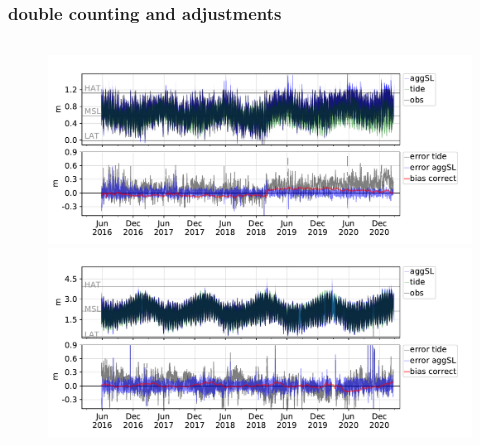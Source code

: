 \begin{frame}
\frametitle{double counting and adjustments}
\begin{columns}
    \begin{column}{0.5\textwidth}
      \begin{figure}      
        \includegraphics[width=\textwidth]{figures/plots/008314_verify_ts.pdf}
        \includegraphics[width=\textwidth]{figures/plots/529020_verify_ts.pdf}
      \end{figure}
    \end{column}


\end{columns}
\end{frame}
